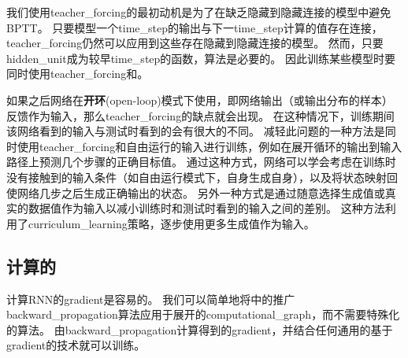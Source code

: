 我们使用\gls{teacher_forcing}的最初动机是为了在缺乏隐藏到隐藏连接的模型中避免\gls{BPTT}。
只要模型一个\gls{time_step}的输出与下一\gls{time_step}计算的值存在连接，\gls{teacher_forcing}仍然可以应用到这些存在隐藏到隐藏连接的模型。
然而，只要\gls{hidden_unit}成为较早\gls{time_step}的函数，算法是必要的。
因此训练某些模型时要同时使用\gls{teacher_forcing}和。


如果之后网络在\textbf{开环}(open-loop)模式下使用，即网络输出（或输出分布的样本）反馈作为输入，那么\gls{teacher_forcing}的缺点就会出现。
在这种情况下，训练期间该网络看到的输入与测试时看到的会有很大的不同。
减轻此问题的一种方法是同时使用\gls{teacher_forcing}和自由运行的输入进行训练，例如在展开循环的输出到输入路径上预测几个步骤的正确目标值。
通过这种方式，网络可以学会考虑在训练时没有接触到的输入条件（如自由运行模式下，自身生成自身），以及将状态映射回使网络几步之后生成正确输出的状态。
另外一种方式\citep{SamyBengio-et-al-arxiv2015}是通过随意选择生成值或真实的数据值作为输入以减小训练时和测试时看到的输入之间的差别。
这种方法利用了\gls{curriculum_learning}策略，逐步使用更多生成值作为输入。

\subsection{计算的}
\label{sec:computing_the_gradient_in_a_recurrent_neural_network}
计算\gls{RNN}的\gls{gradient}是容易的。
我们可以简单地将中的推广\gls{backward_propagation}算法应用于展开的\gls{computational_graph}，而不需要特殊化的算法。
由\gls{backward_propagation}计算得到的\gls{gradient}，并结合任何通用的基于\gls{gradient}的技术就可以训练。

